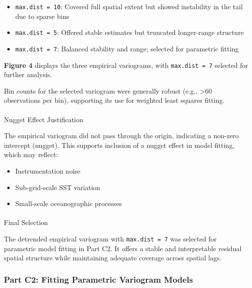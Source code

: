 \documentclass[
  11pt,
]{article}
\makeatletter
\let\oldparagraph\paragraph
\renewcommand{\paragraph}{
    \@ifstar
      \xxxParagraphStar
      \xxxParagraphNoStar
  }
\newcommand{\xxxParagraphStar}[1]{\oldparagraph*{#1}\mbox{}}
\newcommand{\xxxParagraphNoStar}[1]{\oldparagraph{#1}\mbox{}}
\makeatother
\begin{document}
\begin{itemize}
\item
  \texttt{max.dist\ =\ 10}: Covered full spatial extent but showed
  instability in the tail due to sparse bins
\item
  \texttt{max.dist\ =\ 5}: Offered stable estimates but truncated
  longer-range structure
\item
  \texttt{max.dist\ =\ 7}: Balanced stability and range; selected for
  parametric fitting
\end{itemize}

\textbf{Figure 4} displays the three empirical variograms, with
\texttt{max.dist\ =\ 7} selected for further analysis.

Bin counts for the selected variogram were generally robust (e.g.,
\textgreater60 observations per bin), supporting its use for weighted
least squares fitting.

\paragraph{Nugget Effect
Justification}\label{nugget-effect-justification}

The empirical variogram did not pass through the origin, indicating a
non-zero intercept (nugget). This supports inclusion of a nugget effect
in model fitting, which may reflect:

\begin{itemize}
\item
  Instrumentation noise
\item
  Sub-grid-scale SST variation
\item
  Small-scale oceanographic processes
\end{itemize}

\paragraph{Final Selection}\label{final-selection}

The detrended empirical variogram with \texttt{max.dist\ =\ 7} was
selected for parametric model fitting in Part C2. It offers a stable and
interpretable residual spatial structure while maintaining adequate
coverage across spatial lags.

\subsubsection{Part C2: Fitting Parametric Variogram
Models}\label{part-c2-fitting-parametric-variogram-models}
\end{document}
